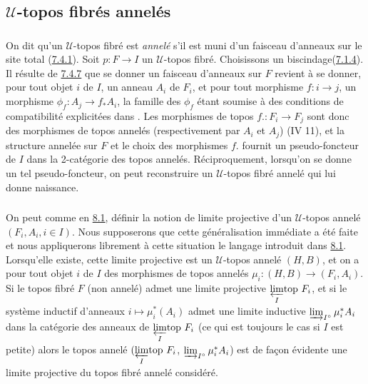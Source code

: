 \documentclass[10pt]{../fichiers-configuration-latex/smfart}
\begin{document}
\subsection{$𝒰$-topos fibrés annelés}

\subsubsection{}

On dit qu'un $𝒰$-topos fibré est \emph{annelé} s'il est muni
d'un faisceau d'anneaux sur le site total (\hyperref[VI.def7.4.1]{7.4.1}). Soit
$p : F \to I$ un $𝒰$-topos fibré. Choisissons un
biscindage\pageoriginale (\hyperref[VI.subsubsec7.1.4]{7.1.4}). Il résulte de
\hyperref[VI.prop7.4.7]{7.4.7} que se donner un faisceau d'anneaux sur $F$
revient à se donner, pour tout objet $i$ de $I$, un anneau $A_i$ de
$F_i$, et pour tout morphisme $f : i \to j$, un morphisme $\phi_f :
A_j \to f_{\ast} A_i$, la famille des $\phi_f$ étant soumise à des
conditions de compatibilité explicitées dans \loccit. Les morphismes
de topos $f. : F_i \to F_j$ sont donc des morphismes de topos
annelés (respectivement par $A_i$ et $A_j$) (IV 11), et la structure
annelée sur $F$ et le choix des morphismes $f$. fournit un
pseudo-foncteur de $I$ dans la 2-catégorie des topos annelés.
Réciproquement, lorsqu'on se donne un tel pseudo-foncteur, on peut
reconstruire un $𝒰$-topos fibré annelé qui lui donne
naissance.

\subsubsection{}

On peut comme en \hyperref[VI.subsec8.1]{8.1}, définir la notion de limite
projective d'un $𝒰$-topos annelé $(F_i, A_i, i \in I)$. Nous
supposerons que cette généralisation immédiate a été faite et nous
appliquerons librement à cette situation le langage introduit dans
\hyperref[VI.subsec8.1]{8.1}. Lorsqu'elle existe, cette limite projective est
un $𝒰$-topos annelé $(H, B)$, et on a pour tout objet $i$ de
$I$ des morphismes de topos annelés $\mu_i : (H, B) \to (F_i, A_i)$.
Si le topos fibré $F$ (non annelé) admet une limite projective
${\displaystyle{\varprojlim_{I}\!\mbox{\rm top }}} F_i$, et si le système inductif d'anneaux $i \mapsto
\mu_i^{\ast}(A_i)$ admet une limite inductive
$\varinjlim_{I^{\circ}}\mu_i^{\ast} A_i$ dans la catégorie des
anneaux de ${\displaystyle{\varprojlim_{I}\!\mbox{\rm top }}} F_i$ (ce qui est toujours le cas si $I$ est
petite) alors le topos annelé $({\displaystyle{\varprojlim_{I}\!\mbox{\rm top }}} F_i$,
$\varinjlim_{I^{\circ}} \mu^{\ast}_i A_i$) est de façon évidente
une limite projective du topos fibré annelé considéré.
\end{document}
